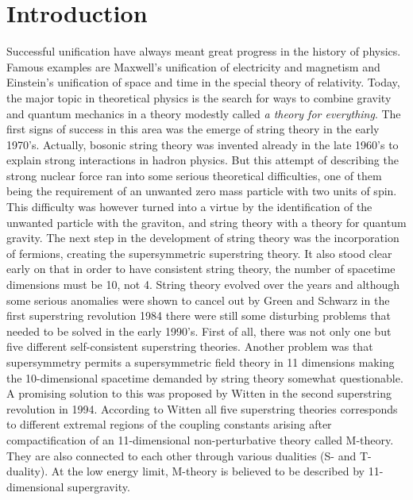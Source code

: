 \chapter{Introduction}
Successful unification have always meant great progress in the history of physics. Famous examples are Maxwell's unification 
of electricity and magnetism and Einstein's unification of space and time in the special theory of relativity.  
Today, the major topic in theoretical physics is the search for ways to combine gravity and quantum mechanics in a theory 
 modestly called \textit{a theory for everything}. The first signs of success in this area was the emerge of 
string theory in the early 1970's. Actually, bosonic string theory was invented already in the late 1960's to explain strong 
interactions in hadron physics. But this attempt of describing the strong nuclear force ran into some serious theoretical 
difficulties, one of them being the requirement of an unwanted zero mass particle with two units of spin. This difficulty 
was however turned into a virtue by the identification of the unwanted particle with the graviton, and string theory with a theory 
for quantum gravity. The next step in the development of string theory was the incorporation of fermions, creating 
the supersymmetric superstring theory. It also stood clear early on that in order to have consistent string theory, the number 
of spacetime dimensions must be 10, not 4. String theory evolved over the years and although some serious anomalies were shown 
to cancel out by Green and Schwarz in the first superstring revolution 1984 there were still some disturbing problems that 
needed to be solved in the early 1990's. First of all, there was not only one but five different self-consistent superstring 
theories. Another problem was that supersymmetry permits a supersymmetric field theory in 11 dimensions making the 10-dimensional 
spacetime demanded by string theory somewhat questionable. A promising solution to this was proposed by Witten in the second superstring 
revolution in 1994. According to Witten all five superstring theories corresponds to different extremal regions of the coupling 
constants arising after compactification of an 11-dimensional non-perturbative theory called M-theory. They are also connected to each 
other through various dualities (S- and T-duality). At the low energy limit, M-theory is believed to be described by 11-dimensional supergravity.

